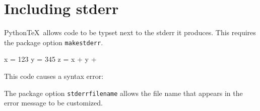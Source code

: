 \documentclass[11pt]{article}
\newcommand{\pytex}{Python\TeX}
\begin{document}
\printpythontex


\section{Including stderr}

\pytex\ allows code to be typset next to the stderr it produces.  This requires the package option \verb|makestderr|.

\begin{pyblock}[errorsession][numbers=left]
x = 123
y = 345
z = x + y +
\end{pyblock}

This code causes a syntax error:

\stderrpythontex[verbatim][frame=single]

The package option \verb|stderrfilename| allows the file name that appears in the error message to be customized.
\end{document}
